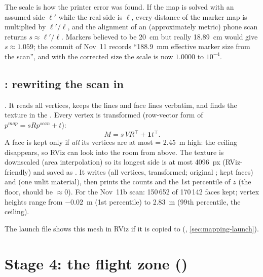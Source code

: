 \begin{intuition}
The scale is how the printer error was found. If the map is solved with an assumed side $\ell'$ while the real
side is $\ell$, every distance of the marker map is multiplied by $\ell'/\ell$, and the alignment of an
(approximately metric) phone scan returns $s \approx \ell'/\ell$. Markers believed to be 20~cm but really 18.89~cm
would give $s \approx 1.059$; the commit of Nov~11 records ``188.9~mm effective marker size from the scan'', and
with the corrected size the scale is now $1.0000$ to $10^{-4}$.
\end{intuition}

\subsection{\texorpdfstring{}{room\_mesh\_to\_map.py}: rewriting the scan in \texorpdfstring{}{map}}

.
It reads all vertices, keeps the  lines and face lines verbatim, and finds the texture in the
. Every vertex is transformed (row-vector form of $p^{map} = s R p^{scan} + t$):
\[
M = s\, V R^\top + \mathbf 1 t^\top .
\]
A face is kept only if \emph{all} its vertices are at most  = 2.45~m high: the ceiling
disappears, so RViz can look into the room from above. The texture is downscaled (area interpolation) so its
longest side is at most 4096~px (RViz-friendly) and saved as . It writes
 (all vertices, transformed; original ; kept faces) and 
(one unlit material), then prints the counts and the 1st percentile of $z$ (the floor, should be $\approx 0$).
For the Nov~11b scan: 150\,652 of 170\,142 faces kept; vertex heights range from $-0.02$~m (1st percentile) to
2.83~m (99th percentile, the ceiling).

The launch file shows this mesh in RViz if it is copied to 
(, \autoref{sec:mapping-launch}).

\section{Stage 4: the flight zone (\texorpdfstring{}{free\_zone.py})}
\label{sec:mapping-zone}

